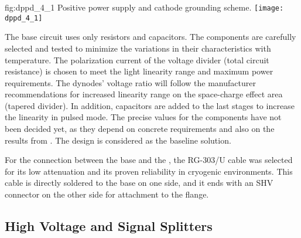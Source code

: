 \begin{dunefigure}{fig:dppd_4_1}
{Positive power supply and cathode grounding scheme.}
\texttt{[image: dppd\_4\_1]}
\end{dunefigure}

The  base circuit uses only resistors and capacitors. The components are carefully selected and tested to minimize the variations in their characteristics with temperature. The polarization current of the voltage divider (total circuit resistance) is chosen to meet the  light linearity range and maximum power requirements. The dynodes' voltage ratio will follow the manufacturer recommendations for increased linearity range on the space-charge effect area (tapered divider). In addition, capacitors are added to the last stages to increase the  linearity in pulsed mode. The precise values for the components have not been decided yet, as they depend on concrete requirements and also on the results from . The  %
design is considered as the baseline solution.

For the connection between the  base and the \fdth, the RG-303/U cable was selected for its low attenuation and its proven reliability in cryogenic environments. %
This cable is directly soldered to the  base on one side, and it ends with an SHV connector on the other side for attachment to the flange. 

\subsection{High Voltage and Signal Splitters}
\label{sec:fddp-pd-4.2}

